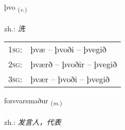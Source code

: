 \documentclass[frontgrid, backgrid]{flacards}\usepackage[]{graphicx}\usepackage[]{xcolor}
\begin{document}
\renewcommand{\flhead}{\vskip5pt \fboxsep=0pt {\small\bfseries\footnotesize Sagnorð | 动词}}
\renewcommand{\fcfoot}{\vskip5pt \fboxsep=0pt \hspace{2pt}{\small\bfseries\footnotesize 3K}}

\renewcommand{\blhead}{\vskip5pt {\small\bfseries\footnotesize Sagnorð | 动词 }}
\renewcommand{\bcfoot}{\vskip5pt \hspace{2pt}{\small\bfseries\footnotesize 3K}}


{þvo \small{\textsubscript{(\textit{v.})}} \\[1ex] %
\textphonetic{[θvɔː]} \\
zh.: \emph{洗} \\  [2ex]
\renewcommand*{\arraystretch}{0.8}
\begin{tabular}{p{1cm}l}
\textsc{1sg}: & þvæ -- þvoði -- þvegið \\ 
\textsc{2sg}: & þværð -- þvoðir -- þvegið \\ 
\textsc{3sg}: & þvær -- þvoði -- þvegið \\ 
\end{tabular}
}

\renewcommand{\flhead}{\vskip5pt \fboxsep=0pt {\small\bfseries\footnotesize Nafnorð | 名词}}
\renewcommand{\fcfoot}{\vskip5pt \fboxsep=0pt \hspace{2pt}{\small\bfseries\footnotesize 3K}}

\renewcommand{\blhead}{\vskip5pt {\small\bfseries\footnotesize Nafnorð | 名词 }}
\renewcommand{\bcfoot}{\vskip5pt \hspace{2pt}{\small\bfseries\footnotesize 3K}}


{forsvarsmaður \small{\textsubscript{(\textit{m.})}} \\[1ex] %
 \\
zh.: \emph{发言人，代表} \\  [2ex]
\renewcommand*{\arraystretch}{0.8}
}
\end{document}
